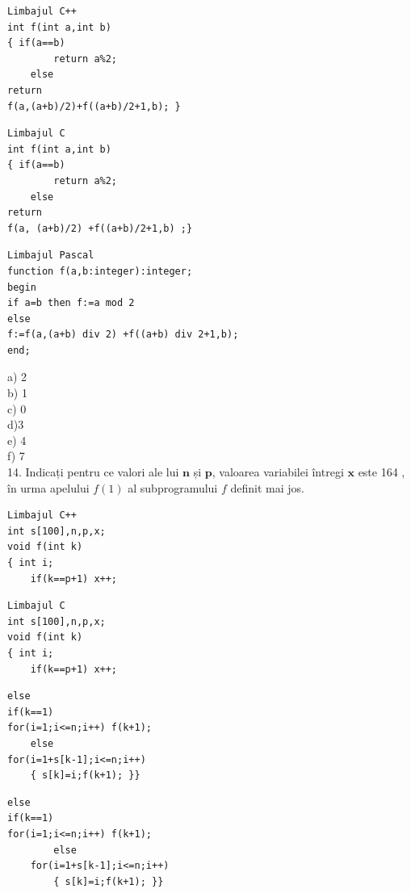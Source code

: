 \documentclass[10pt]{article}
\begin{document}
\begin{verbatim}
Limbajul C++
int f(int a,int b)
{ if(a==b)
        return a%2;
    else
return
f(a,(a+b)/2)+f((a+b)/2+1,b); }
\end{verbatim}

\begin{verbatim}
Limbajul C
int f(int a,int b)
{ if(a==b)
        return a%2;
    else
return
f(a, (a+b)/2) +f((a+b)/2+1,b) ;}
\end{verbatim}

\begin{verbatim}
Limbajul Pascal
function f(a,b:integer):integer;
begin
if a=b then f:=a mod 2
else
f:=f(a,(a+b) div 2) +f((a+b) div 2+1,b);
end;
\end{verbatim}

a) 2\\
b) 1\\
c) 0\\
d)3\\
e) 4\\
f) 7\\
14. Indicați pentru ce valori ale lui $\mathbf{n}$ și $\mathbf{p}$, valoarea variabilei întregi $\mathbf{x}$ este 164 , în urma apelului $f(1)$ al subprogramului $f$ definit mai jos.

\begin{verbatim}
Limbajul C++
int s[100],n,p,x;
void f(int k)
{ int i;
    if(k==p+1) x++;
\end{verbatim}

\begin{verbatim}
Limbajul C
int s[100],n,p,x;
void f(int k)
{ int i;
    if(k==p+1) x++;
\end{verbatim}

\begin{verbatim}
else
if(k==1)
for(i=1;i<=n;i++) f(k+1);
    else
for(i=1+s[k-1];i<=n;i++)
    { s[k]=i;f(k+1); }}
\end{verbatim}

\begin{verbatim}
else
if(k==1)
for(i=1;i<=n;i++) f(k+1);
        else
    for(i=1+s[k-1];i<=n;i++)
        { s[k]=i;f(k+1); }}
\end{verbatim}
\end{document}
